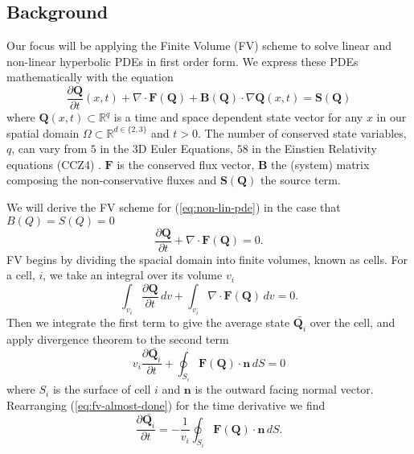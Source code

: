\subsection{Background}
Our focus will be applying the Finite Volume (FV) scheme to solve linear and non-linear hyperbolic PDEs in first order form.
We express these PDEs mathematically with the equation
\begin{equation}\label{eq:non-lin-pde}
    \frac{\partial \mathbf{Q}}{\partial t}(x,t) + \nabla \cdot \mathbf{F}(\mathbf{Q}) + \mathbf{B}(\mathbf{Q}) \cdot \nabla \mathbf{Q}(x,t) = \mathbf{S}(\mathbf{Q})
\end{equation}
where $\mathbf{Q}(x,t)\subset \mathbb{R}^q$ is a time and space dependent state vector for any $x$ in our spatial domain $\Omega\subset \mathbb{R}^{d \in \{2,3\}}$ and $t>0$.
The number of conserved state variables, $q$, can vary from $5$ in the 3D Euler Equations, $58$ in the Einstien Relativity equations (CCZ4) \cite{CCZ4}.
$\mathbf{F}$ is the conserved flux vector, $\mathbf{B}$ the (system) matrix composing the non-conservative fluxes and $\mathbf{S}(\mathbf{Q})$ the source term.


We will derive the FV scheme for  (\ref{eq:non-lin-pde}) in the case that $B(Q)=S(Q)=0$
\begin{equation*}
    \frac{\partial \mathbf{Q}}{\partial t} + \nabla\cdot \mathbf{F}(\mathbf{Q}) = 0.
\end{equation*}
FV begins by dividing the spacial domain into finite volumes, known as cells.
For a cell, $i$, we take an integral over its volume $v_i$
\begin{equation*}
    \int_{v_i}\frac{\partial \mathbf{Q}}{\partial t}\,dv + \int_{v_i}\nabla\cdot \mathbf{F}(\mathbf{Q})\,dv = 0.
\end{equation*}
Then we integrate the first term to give the average state $\bar{\mathbf{Q}_i}$ over the cell, and apply divergence theorem to the second term
\begin{equation}\label{eq:fv-almost-done}
    v_i\frac{\partial \bar{\mathbf{Q}_i}}{\partial t} + \oint_{S_i}\mathbf{F}(\mathbf{Q})\cdot \mathbf{n} \, dS = 0
\end{equation}
where $S_i$ is the surface of cell $i$ and $\mathbf{n}$ is the outward facing normal vector.
Rearranging (\ref{eq:fv-almost-done}) for the time derivative we find
\begin{equation}\label{eq:fv-done}
   \frac{\partial \bar{\mathbf{Q}_i}}{\partial t} = -\frac{1}{v_i} \oint_{S_i}\mathbf{F}(\mathbf{Q})\cdot \mathbf{n} \, dS.
\end{equation}

